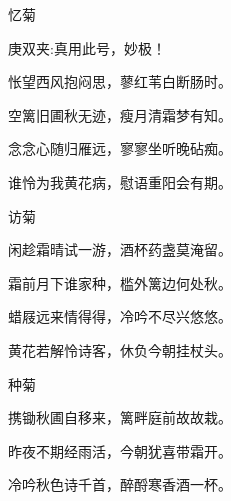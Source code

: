 \begin{poem}
    \begin{pl}忆菊　\end{pl}
    \begin{note}庚双夹:真用此号，妙极！\end{note}

    \begin{pl}怅望西风抱闷思，蓼红苇白断肠时。\end{pl}

    \begin{pl}空篱旧圃秋无迹，瘦月清霜梦有知。\end{pl}

    \begin{pl}念念心随归雁远，寥寥坐听晚砧痴。\end{pl}

    \begin{pl}谁怜为我黄花病，慰语重阳会有期。\end{pl}
    \emptypl

    \begin{pl}访菊　\end{pl}

    \begin{pl}闲趁霜晴试一游，酒杯药盏莫淹留。\end{pl}

    \begin{pl}霜前月下谁家种，槛外篱边何处秋。\end{pl}

    \begin{pl}蜡屐远来情得得，冷吟不尽兴悠悠。\end{pl}

    \begin{pl}黄花若解怜诗客，休负今朝挂杖头。\end{pl}
    \emptypl

    \begin{pl}种菊　\end{pl}

    \begin{pl}携锄秋圃自移来，篱畔庭前故故栽。\end{pl}

    \begin{pl}昨夜不期经雨活，今朝犹喜带霜开。\end{pl}

    \begin{pl}冷吟秋色诗千首，醉酹寒香酒一杯。\end{pl}


\end{poem}
